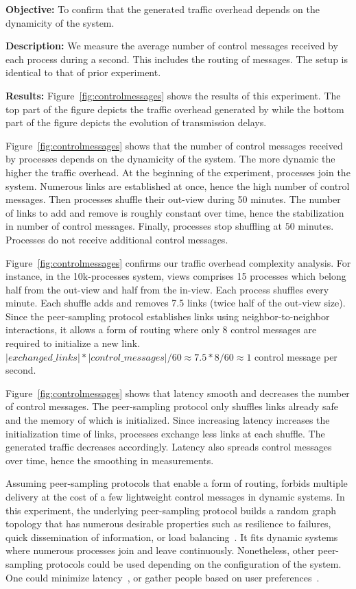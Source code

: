 \noindent \textbf{Objective:} To confirm that the generated traffic overhead
depends on the dynamicity of the system.

\noindent \textbf{Description:} We measure the average number of control
messages received by each process during a second. This includes the routing of
messages. The setup is identical to that of prior experiment.

\noindent \textbf{Results:} Figure~\ref{fig:controlmessages} shows the results of
this experiment. The top part of the figure depicts the traffic overhead
generated by \RPCBROADCAST while the bottom part of the figure depicts the
evolution of transmission delays.

\noindent Figure~\ref{fig:controlmessages} shows that the number of control
messages received by processes depends on the dynamicity of the system. The more
dynamic the higher the traffic overhead. At the beginning of the experiment,
processes join the system. Numerous links are established at once, hence the
high number of control messages. Then processes shuffle their out-view during 50
minutes. The number of links to add and remove is roughly constant over time,
hence the stabilization in number of control messages. Finally, processes stop
shuffling at $50$ minutes. Processes do not receive additional control messages.

\noindent Figure~\ref{fig:controlmessages} confirms our traffic overhead
complexity analysis. For instance, in the 10k-processes system, views comprises
15 processes which belong half from the out-view and half from the in-view.
Each process shuffles every minute. Each shuffle adds and removes 7.5 links
(twice half of the out-view size). Since the peer-sampling protocol establishes
links using neighbor-to-neighbor interactions, it allows a form of routing where
only 8 control messages are required to initialize a new link.
$|exchanged\_links|*|control\_messages|/60 \approx 7.5*8/60 \approx 1$ control
message per second.

\noindent Figure~\ref{fig:controlmessages} shows that latency smooth and
decreases the number of control messages. The peer-sampling protocol only
shuffles links already safe and the memory of which is initialized. Since
increasing latency increases the initialization time of links, processes
exchange less links at each shuffle. The generated traffic decreases
accordingly. Latency also spreads control messages over time, hence the
smoothing in measurements.

\noindent Assuming peer-sampling protocols that enable a form of routing,
\RPCBROADCAST forbids multiple delivery at the cost of a few lightweight control
messages in dynamic systems. In this experiment, the underlying peer-sampling
protocol builds a random graph topology that has numerous desirable properties
such as resilience to failures, quick dissemination of information, or load
balancing~\cite{jelasity2007gossip}. It fits dynamic systems where numerous
processes join and leave continuously. Nonetheless, other peer-sampling
protocols could be used depending on the configuration of the system.  One could
minimize latency~\cite{dabek2004vivaldi}, or gather people based on user
preferences~\cite{jelasity2009tman}.

